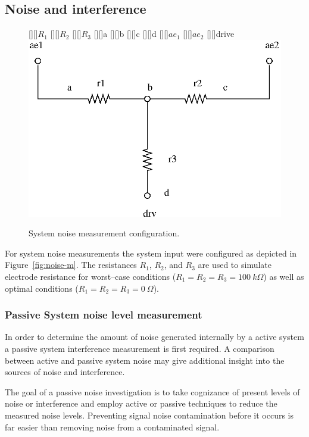 \subsection{Noise and interference}
\begin{figure}[htbp]
\begin{center}
	[][]{$R_1$}
	[][]{$R_2$}
	[][]{$R_3$}
	[][]{a}
	[][]{b}
	[][]{c}
	[][]{d}
	[][]{$ae_1$}
	[][]{$ae_2$}
	[][]{drive}
	\includegraphics{noise-m.eps}
	\caption{System noise measurement configuration.}
\label{fig:noise-m}
\end{center}
\end{figure}

For system noise measurements the system input were configured as
depicted in Figure~\vref{fig:noise-m}. The resistances $R_1$, $R_2$,
and $R_3$ are used to simulate electrode resistance for worst--case
conditions ($R_1 = R_2 = R_3 = 100~k\Omega$) as well as optimal
conditions ($R_1 = R_2 = R_3 = 0~\Omega$).

\subsubsection{Passive System noise level measurement}

In order to determine the amount of noise generated internally by a
active system a passive system interference measurement is first
required. A comparison between active and passive system noise may
give additional insight into the sources of noise and interference. 

The goal of a passive noise investigation is to take cognizance of
present levels of noise or interference and employ active or passive
techniques to reduce the measured noise levels. Preventing signal
noise contamination before it occurs is far easier than removing noise
from a contaminated signal.

